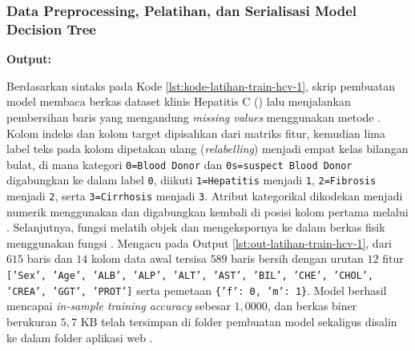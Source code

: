 \documentclass[a4paper,oneside,11pt]{book}
\begin{document}
\subsubsection{Data Preprocessing, Pelatihan, dan Serialisasi Model Decision Tree}

\par \textbf{Output:}

\par Berdasarkan sintaks pada Kode \ref{lst:kode-latihan-train-hcv-1}, skrip pembuatan model membaca berkas dataset klinis Hepatitis C () lalu menjalankan pembersihan baris yang mengandung \textit{missing values} menggunakan metode . Kolom indeks  dan kolom target  dipisahkan dari matriks fitur, kemudian lima label teks pada kolom  dipetakan ulang (\textit{relabelling}) menjadi empat kelas bilangan bulat, di mana kategori \texttt{0=Blood Donor} dan \texttt{0s=suspect Blood Donor} digabungkan ke dalam label \texttt{0}, diikuti \texttt{1=Hepatitis} menjadi \texttt{1}, \texttt{2=Fibrosis} menjadi \texttt{2}, serta \texttt{3=Cirrhosis} menjadi \texttt{3}. Atribut kategorikal  dikodekan menjadi numerik menggunakan  dan digabungkan kembali di posisi kolom pertama melalui . Selanjutnya, fungsi  melatih objek  dan mengekspornya ke dalam berkas fisik  menggunakan fungsi . Mengacu pada Output \ref{lst:out-latihan-train-hcv-1}, dari $615$ baris dan $14$ kolom data awal tersisa $589$ baris bersih dengan urutan $12$ fitur \texttt{['Sex', 'Age', 'ALB', 'ALP', 'ALT', 'AST', 'BIL', 'CHE', 'CHOL', 'CREA', 'GGT', 'PROT']} serta pemetaan  \texttt{\{'f': 0, 'm': 1\}}. Model berhasil mencapai \textit{in-sample training accuracy} sebesar $1{,}0000$, dan berkas biner  berukuran $5{,}7\text{ KB}$ telah tersimpan di folder pembuatan model sekaligus disalin ke dalam folder aplikasi web .
\end{document}
